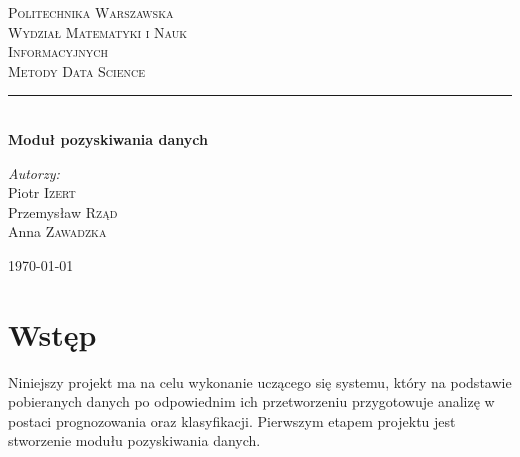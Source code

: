 \documentclass{article}
\begin{document}
	
\begin{titlepage}

\newcommand{\HRule}{\rule{\linewidth}{0.5mm}}

\center


\textsc{\LARGE Politechnika Warszawska}\\[10mm]
\textsc{\LARGE Wydział Matematyki i Nauk}\\[4mm]
\textsc{\LARGE Informacyjnych}\\[4cm]
 

\textsc{\Huge Metody Data Science}\\[0.5cm]


\HRule \\[0.4cm]
{ \LARGE \bfseries Moduł pozyskiwania danych}\\[5.0cm]
 
 

\begin{flushright}
\Large \emph{Autorzy:}\\[0.5cm]
Piotr \textsc{Izert}\\
Przemysław \textsc{Rząd}\\
Anna \textsc{Zawadzka}\\
\end{flushright}


\vfill
{\large \today}\\[3cm]

\end{titlepage}
	
\newpage

\section{Wstęp}

Niniejszy projekt ma na celu wykonanie uczącego się systemu, który na podstawie pobieranych danych po odpowiednim ich przetworzeniu przygotowuje analizę w postaci prognozowania oraz  klasyfikacji. Pierwszym etapem projektu jest stworzenie modułu pozyskiwania danych.
\end{document}
